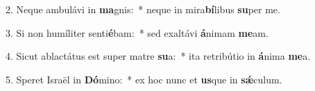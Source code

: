 2. Neque ambulávi in \textbf{ma}gnis:~*  neque in mira\textbf{bí}libus \textbf{su}per me.\

3. Si non humíliter senti\textbf{é}bam:~*  sed exaltávi \textbf{á}nimam \textbf{me}am.\

4. Sicut ablactátus est super matre \textbf{su}a:~*  ita retribútio in \textbf{á}nima \textbf{me}a.\

5. Speret Israël in \textbf{Dó}mino:~*  ex hoc nunc et \textbf{us}que in \textbf{sǽ}culum.\

